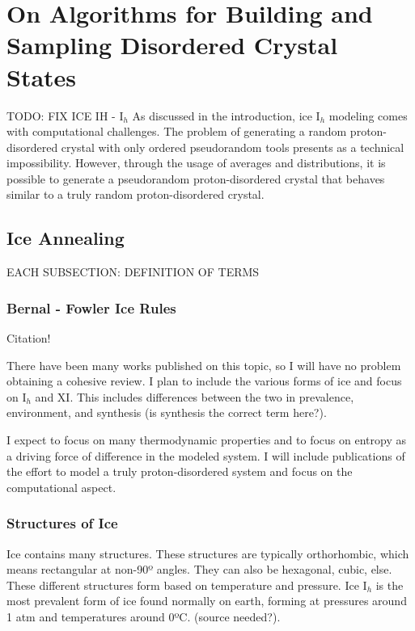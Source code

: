 \chapter{On Algorithms for Building and Sampling Disordered Crystal States}
\label{ch:iceXI}

TODO: FIX ICE IH - I$_{h}$
As discussed in the introduction, ice I$_{h}$ modeling comes with computational challenges. 
The problem of generating a random proton-disordered crystal with only ordered pseudorandom tools presents as a technical impossibility. 
However, through the usage of averages and distributions, it is possible to generate a pseudorandom proton-disordered crystal that behaves similar to a truly random proton-disordered crystal.


\section{Ice Annealing}

EACH SUBSECTION: DEFINITION OF TERMS

\subsection{Bernal - Fowler Ice Rules}

Citation! \cite{BFIceOG}

There have been many works published on this topic, so I will have no problem obtaining a cohesive review. I plan to include the various forms of ice and focus on I$_{h}$ and XI. This includes differences between the two in prevalence, environment, and synthesis (is synthesis the correct term here?). 

I expect to focus on many thermodynamic properties and to focus on entropy as a driving force of difference in the modeled system. I will include publications of the effort to model a truly proton-disordered system and focus on the computational aspect. 

\subsection{Structures of Ice}

Ice contains many structures.
These structures are typically orthorhombic, which means rectangular at non-90º angles.
They can also be hexagonal, cubic, else. 
These different structures form based on temperature and pressure. 
Ice I$_{h}$ is the most prevalent form of ice found normally on earth, forming at pressures around 1 atm and temperatures around 0ºC. (source needed?).

